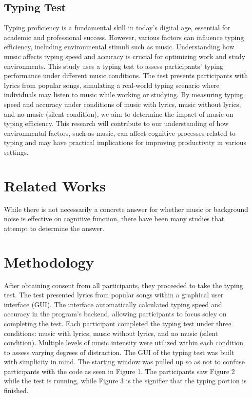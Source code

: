 \documentclass[sigconf]{acmart}
\begin{document}
\subsection{Typing Test}
  Typing proficiency is a fundamental skill in today's digital age, essential for academic and professional success. However, various factors can influence typing efficiency, including environmental stimuli such as music. Understanding how music affects typing speed and accuracy is crucial for optimizing work and study environments.
  This study uses a typing test to assess participants' typing performance under different music conditions. The test presents participants with lyrics from popular songs, simulating a real-world typing scenario where individuals may listen to music while working or studying.
  By measuring typing speed and accuracy under conditions of music with lyrics, music without lyrics, and no music (silent condition), we aim to determine the impact of music on typing efficiency. This research will contribute to our understanding of how environmental factors, such as music, can affect cognitive processes related to typing and may have practical implications for improving productivity in various settings.

\section{Related Works}
While there is not necessarily a concrete answer for whether music or background noise is effective on cognitive function, there have been many
studies that attempt to determine the answer.


\section{Methodology}
  After obtaining consent from all participants, they proceeded to take the typing test. The test presented lyrics from popular songs within a graphical user interface (GUI). 
  The interface automatically calculated typing speed and accuracy in the program's backend, allowing participants to focus soley on completing the test.
  Each participant completed the typing test under three conditions: music with lyrics, music without lyrics, and no music (silent condition).
  Multiple levels of music intensity were utilized within each condition to assess varying degrees of distraction.
  The GUI of the typing test was built with simplicity in mind. The starting window was pulled up so as not to confuse participants with the code as seen in Figure 1. The participants saw Figure 2 while the test is running, while Figure 3 is the signifier that the typing portion is finished. 
\end{document}
